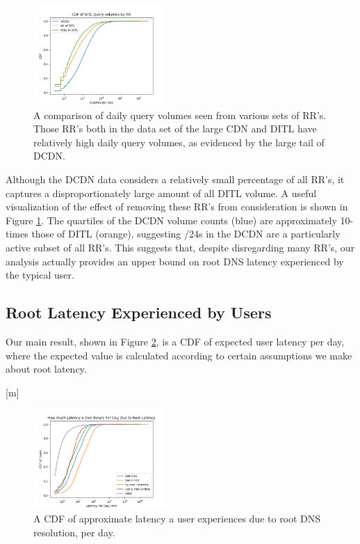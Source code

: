 \documentclass[sigconf,nonacm,10pt]{acmart}
\begin{document}
\begin{figure}
    \centering
    \includegraphics[width=0.45\textwidth]{figures/ditl_volume_comparisons.png}
    \caption{A comparison of daily query volumes seen from various sets of RR's. Those RR's both in the data set of the large CDN and DITL have relatively high daily query volumes, as evidenced by the large tail of DCDN. }
    \label{fig:ditl_volume_comparisons}
\end{figure}

Although the DCDN data considers a relatively small percentage of all
RR's, it captures a disproportionately large amount of all DITL volume.
A useful visualization of the effect of removing these RR's from
consideration is shown in Figure \ref{fig:ditl_volume_comparisons}. The
quartiles of the DCDN volume counts (blue) are approximately 10-times
those of DITL (orange), suggesting /24s in the DCDN are a particularly
active subset of all RR's. This suggests that, despite disregarding many
RR's, our analysis actually provides an upper bound on root DNS latency
experienced by the typical user.

\subsection{Root Latency Experienced by
Users}\label{root-latency-experienced-by-users-1}

Our main result, shown in Figure \ref{fig:user_root_latency_per_day}, is
a CDF of expected user latency per day, where the expected value is
calculated according to certain assumptions we make about root latency.

{[}m{]}

\begin{figure}
    \centering
    \includegraphics[width=0.45\textwidth]{figures/user_root_latency_per_day.png}
    \caption{A CDF of approximate latency a user experiences due to root DNS resolution, per day.}
    \label{fig:user_root_latency_per_day}
\end{figure}
\end{document}
